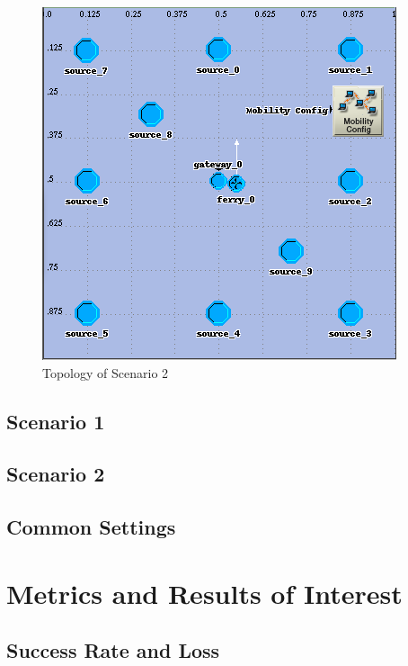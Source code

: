 \begin{figure}[h]
    \centering
    \includegraphics[width=.5\textwidth]{images/scenario2-top}
    \caption{Topology of Scenario 2}
    \label{fig:scenario2}
\end{figure}


\subsection{Scenario 1}


\subsection{Scenario 2}


\subsection{Common Settings}



\section{Metrics and Results of Interest }


\subsection{Success Rate and Loss}

